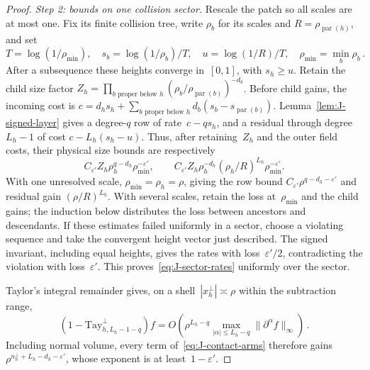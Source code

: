\begin{proof}
\emph{Step 2: bounds on one collision sector.} Rescale the patch so all scales are at most one. Fix its finite collision tree, write $\rho_b$ for its scales and $R=\rho_{\operatorname{par}(h)}$, and set
\begin{equation*}
T=\log(1/\rho_{\min}),\quad s_b=\log(1/\rho_b)/T,\quad u=\log(1/R)/T,\quad\rho_{\min}=\min_b\rho_b\,.
\end{equation*}
After a subsequence these heights converge in~$[0,1]$, with $s_h\ge u$. Retain the child size factor $Z_h=\prod_{b\text{ proper below }h}(\rho_b/\rho_{\operatorname{par}(b)})^{-d_b}$.
Before child gains, the incoming cost is $c=d_hs_h+\sum_{b\text{ proper below }h}d_b(s_b-s_{\operatorname{par}(b)})$.
Lemma~\ref{lem:J-signed-layer} gives a degree-$q$ row of rate~$c-qs_h$, and a residual through degree~$L_h-1$ of cost $c-L_h(s_h-u)$. Thus, after retaining~$Z_h$ and the outer field costs, their physical size bounds are respectively
\begin{equation}\label{eq:J-sector-rates}
C_{\varepsilon'}Z_h\rho_h^{q-d_h}\rho_{\min}^{-\varepsilon'},\qquad
C_{\varepsilon'}Z_h\rho_h^{-d_h}(\rho_h/R)^{L_h}\rho_{\min}^{-\varepsilon'}.
\end{equation}
With one unresolved scale, $\rho_{\min}=\rho_h=\rho$, giving the row bound $C_{\varepsilon'}\rho^{q-d_h-\varepsilon'}$ and residual gain $(\rho/R)^{L_h}$. With several scales, retain the loss at~$\rho_{\min}$ and the child gains; the induction below distributes the loss between ancestors and descendants. If these estimates failed uniformly in a sector, choose a violating sequence and take the convergent height vector just described. The signed invariant, including equal heights, gives the rates with loss~$\varepsilon'/2$, contradicting the violation with loss~$\varepsilon'$. This proves~\eqref{eq:J-sector-rates} uniformly over the sector.

Taylor's integral remainder gives, on a shell~$|x_h^\perp|\asymp\rho$ within the subtraction range,
\begin{equation*}
(1-\mathrm{Tay}_{h,L_h-1-q}^{\perp})f
=O\!\left(\rho^{L_h-q}\max_{|\alpha|\le L_h-q}\|\partial^\alpha f\|_\infty\right)\,.
\end{equation*}
Including normal volume, every term of~\eqref{eq:J-contact-arms} therefore gains~$\rho^{n^\perp_h+L_h-d_h-\varepsilon'}$, whose exponent is at least~$1-\varepsilon'$.


\end{proof}
